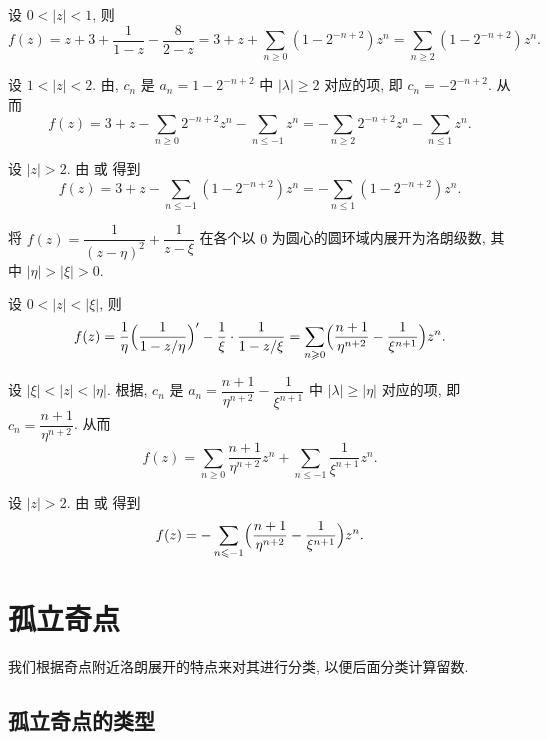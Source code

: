 \begin{solutionenum}
  \item 设 $0<|z|<1$, 则
  \[
      f(z)
    =z+3+\frac1{1-z}-\frac8{2-z}
    =3+z+\sum_{n\ge 0}(1-2^{-n+2})z^n
    =\sum_{n\ge 2}(1-2^{-n+2})z^n.
  \]
  \item 设 $1<|z|<2$. 由, $c_n$ 是 $a_n=1-2^{-n+2}$ 中 $|\lambda|\ge 2$ 对应的项, 即 $c_n=-2^{-n+2}$. 从而
  \[
      f(z)
    =3+z-\sum_{n\ge0}2^{-n+2}z^n-\sum_{n\le-1}z^n
    =-\sum_{n\ge 2}2^{-n+2}z^n-\sum_{n\le 1}z^n.
  \]
  \item 设 $|z|>2$. 由 或 得到
  \[
      f(z)
    =3+z-\sum_{n\le -1}(1-2^{-n+2})z^n
    =-\sum_{n\le1}(1-2^{-n+2})z^n.
  \]
\end{solutionenum}

\begin{example}
  将 $f(z)=\dfrac1{(z-\eta)^2}+\dfrac1{z-\xi}$ 在各个以 $0$ 为圆心的圆环域内展开为洛朗级数, 其中 $|\eta|>|\xi|>0$. 
\end{example}

\begin{solutionenum}
  \item 设 $0<|z|<|\xi|$, 则
  \[
      f(z)
    =\frac1{\eta}\Bigl(\frac1{1-z/\eta}\Bigr)'-\frac1\xi\cdot\frac1{1-z/\xi}
    =\sum_{n\ge 0}\Bigl(\frac{n+1}{\eta^{n+2}}-\frac1{\xi^{n+1}}\Bigr)z^n.
  \]
  \item 设 $|\xi|<|z|<|\eta|$. 根据, $c_n$ 是 $a_n=\dfrac{n+1}{\eta^{n+2}}-\dfrac1{\xi^{n+1}}$ 中 $|\lambda|\ge |\eta|$ 对应的项, 即 $c_n=\dfrac{n+1}{\eta^{n+2}}$. 从而
  \[
      f(z)
    =\sum_{n\ge 0}\frac{n+1}{\eta^{n+2}}z^n+\sum_{n\le -1}\frac1{\xi^{n+1}}z^n.
  \]
  \item 设 $|z|>2$. 由 或 得到
  \[
      f(z)
    =-\sum_{n\le -1}\Bigl(\frac{n+1}{\eta^{n+2}}-\frac1{\xi^{n+1}}\Bigr)z^n.
  \]
\end{solutionenum}



\section{孤立奇点}

我们根据奇点附近洛朗展开的特点来对其进行分类, 以便后面分类计算留数.

\subsection{孤立奇点的类型}

